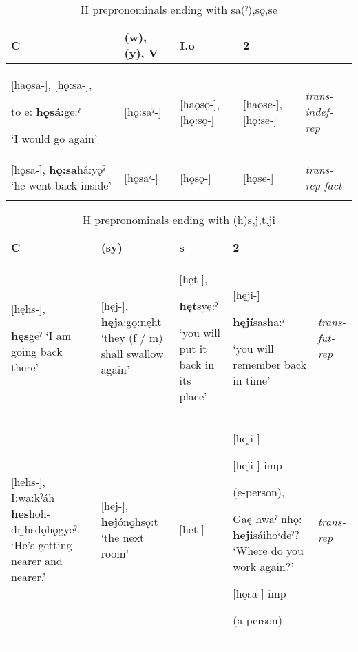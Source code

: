 \begin{table}
\caption{H prepronominals ending with sa(ˀ),sǫ,se}
\label{tab:1:transindefrepfact}
\scriptsize{
\begin{tabularx}{\textwidth}{XXXXX}
\lsptoprule
C & (w), (y), V & I.o & 2 & \\
\midrule
{}[haǫsa-], [hǫ:sa-], 

to e: \textbf{hǫsá:}ge:ˀ 

‘I would go again’ & [hǫ:saˀ-] & [haǫsǫ-], {}[hǫ:sǫ-] & [haǫse-], [hǫ:se-] & {\itshape trans-indef-rep}\\
\midrule
{}[hǫsa-], \textbf{hǫ:sa}há:yǫˀ ‘he went back inside’ & [hǫsaˀ-] & [hǫsǫ-] & [hǫse-] & {\itshape trans-rep-fact}\\
\lspbottomrule
\end{tabularx}}
\end{table}

\lipsum[1-1]


\begin{table}
\caption{H prepronominals ending with (h)s,j,t,ji}
\label{tab:1:transfutrep}
\scriptsize{
\begin{tabularx}{\textwidth}{XXXXX}
\lsptoprule
C & (sy) & s & 2 & \\
\midrule
{}[hęhs-], 

\textbf{hęs}geˀ ‘I am going back there’ & [hęj-], \textbf{hęj}a:gǫ:nęht ‘they (f / m) shall swallow again’ & [hęt-], 

\textbf{hęt}syę:ˀ 

‘you will put it back in its place’ & [hęji-] 

\textbf{hęjí}sasha:ˀ 

‘you will remember back in time’ & {\itshape trans-fut-rep}\\
\midrule
{}[hehs-], I:wa:kˀáh \textbf{hes}hoh-dri̱hsdǫhǫgyeˀ.
‘He’s getting nearer and nearer.’ & [hej-], \textbf{hej}ónǫ̱hsǫ:t ‘the next room’ & [het-] & [heji-]

[heji-] imp 

(e-person), 

Gaę hwaˀ nhǫ: \textbf{heji}sáihoˀdeˀ? ‘Where do you work again?’ 

{}[hǫsa-] imp 

(a-person) & {\itshape trans-rep}\\
\lspbottomrule
\end{tabularx}}
\end{table}


